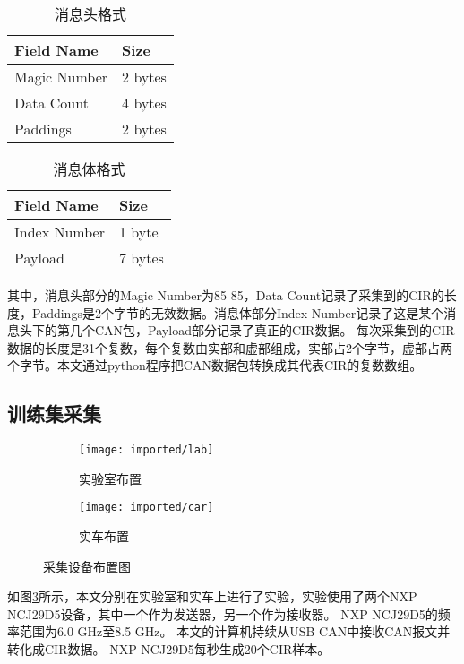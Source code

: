 \noindent
\begin{minipage}{.5\textwidth}
    \begin{table}[H]
        \caption{\label{tab:Header}消息头格式}
        \centering
        \begin{tabular}{|l|l|}
        \hline
        Field Name & Size \\
        \hline
        Magic Number & 2 bytes \\
        \hline
        Data Count & 4 bytes \\
        \hline
        Paddings & 2 bytes \\
        \hline
        \end{tabular}
    \end{table}
\end{minipage}%
\begin{minipage}{.5\textwidth}
    \begin{table}[H]
        \caption{\label{tab:Payload}消息体格式}
        \centering
        \begin{tabular}{|l|l|}
        \hline
        Field Name & Size \\
        \hline
        Index Number & 1 byte \\
        \hline
        Payload & 7 bytes \\
        \hline
        \end{tabular}
    \end{table}
\end{minipage}
\vspace{\baselineskip} %

其中，消息头部分的Magic Number为85 85，Data Count记录了采集到的CIR的长度，Paddings是2个字节的无效数据。消息体部分Index Number记录了这是某个消息头下的第几个CAN包，Payload部分记录了真正的CIR数据。
每次采集到的CIR数据的长度是31个复数，每个复数由实部和虚部组成，实部占2个字节，虚部占两个字节。本文通过python程序把CAN数据包转换成其代表CIR的复数数组。

\subsection{训练集采集}
\begin{figure}[htbp]
    \centering
    \begin{subfigure}{0.45\textwidth}
        \centering
        \texttt{[image: imported/lab]}
        \caption{\label{fig:lab}实验室布置}
    \end{subfigure}%
    \centering
    \begin{subfigure}{0.45\textwidth}
        \centering
        \texttt{[image: imported/car]}
        \caption{\label{fig:car}实车布置}
    \end{subfigure}%
    \caption{采集设备布置图}
    \label{fig:lab_car_setup}
\end{figure}
如图\ref{fig:lab_car_setup}所示，本文分别在实验室和实车上进行了实验，实验使用了两个NXP NCJ\-29D5设备，其中一个作为发送器，另一个作为接收器。
NXP NCJ29D5的频率范围为6.0 GHz至8.5 GHz。
本文的计算机持续从USB CAN中接收CAN报文并转化成CIR数据。
NXP NCJ29D5每秒生成20个CIR样本。

